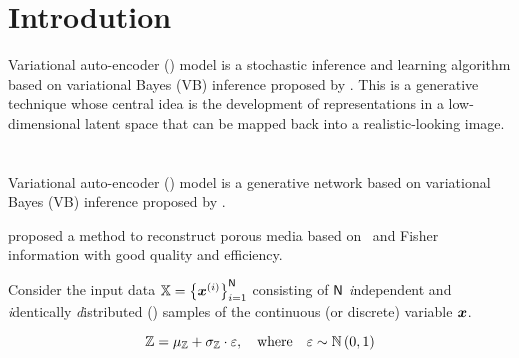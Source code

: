 \section{Introdution}

Variational auto-encoder (\VAE) model is a stochastic inference and learning algorithm based on variational Bayes (VB) inference proposed by \cite{kingma2014}.
This is a generative technique whose central idea is the development of representations in a low-dimensional latent space that can be mapped back into a realistic-looking image.


\cite{Higgins2016betaVAELB}
\section{\cite{Zhang2022}}

Variational auto-encoder (\VAE) model is a generative network based on variational Bayes (VB) inference proposed by \cite{kingma2014}.

\cite{Zhang2022} proposed a method to reconstruct porous media based on \VAE\ and Fisher information with good quality and efficiency.

Consider the input data $\mathbb{X} = \left\{ \boldsymbol{x}^{(i)} \right\}_{i=1}^{\mathsf{N}}$ consisting of $\mathsf{N}$
\textit{i}ndependent and \textit{i}dentically \textit{d}istributed (\iid) samples of the continuous (or discrete) variable $\boldsymbol{x}$.

\begin{figure}[H]
 \centering
 
\end{figure}

\begin{equation}
 \mathbb{Z} = {\mu_{\mathbb{Z}}} + {\sigma_{\mathbb{Z}}} \cdot \varepsilon, \quad \mbox{where} \quad \varepsilon \sim \mathbb{N}\left(0,1\right)
\end{equation}

